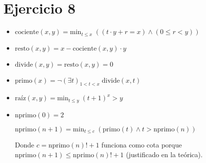 \section*{Ejercicio 8}

\begin{itemize}
    \item $\text{cociente}(x, y) = \text{min}_{t \leq x} \; ((t \cdot y + r = x) \land (0 \leq r < y))$

    \item $\text{resto}(x, y) = x - \text{cociente}(x, y) \cdot y$

    \item $\text{divide}(x, y) = \text{resto}(x, y) = 0$

    \item $\text{primo}(x) = \neg (\exists t)_{1 < t < x}\; \text{divide}(x, t)$

    \item $\text{raíz}(x, y) = \text{min}_{t \leq y} \; (t + 1)^x > y$

    \item $\text{nprimo}(0) = 2$

    $\text{nprimo}(n + 1) = \text{min}_{t \leq c} \; (\text{primo}(t) \land t > \text{nprimo}(n))$

    Donde $c = \text{nprimo}(n)! + 1$ funciona como cota porque $\text{nprimo}(n + 1) \leq \text{nprimo}(n)! + 1$ (justificado en la teórica).
\end{itemize}
